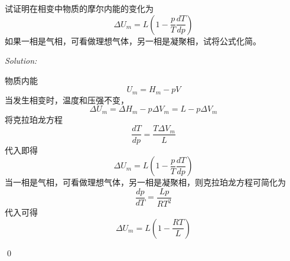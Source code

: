\documentclass[12pt,a4paper]{article}
\newenvironment{problem}[2][Problem]{\begin{trivlist}
\item[\hskip \labelsep {\bfseries #1}\hskip \labelsep {\bfseries #2.}]}{\end{trivlist}}
\newenvironment{sol}
    {\emph{Solution:}
    }
    {
    \qed
    }
\begin{document}
\begin{problem}{3.7}
试证明在相变中物质的摩尔内能的变化为
\[
\Delta U_m=L(1-\frac{p}{T}\frac{dT}{dp})
\]
如果一相是气相，可看做理想气体，另一相是凝聚相，试将公式化简。
\end{problem}
\begin{sol}
物质内能
\begin{equation}
U_m=H_m-pV
\end{equation}
当发生相变时，温度和压强不变，
\begin{equation}
\Delta U_m=\Delta H_m-p\Delta V_m=L-p\Delta V_m
\end{equation}
将克拉珀龙方程
\begin{equation}
\frac{dT}{dp}=\frac{T\Delta V_m}{L}
\end{equation}
代入即得
\begin{equation}
\Delta U_m=L(1-\frac{p}{T}\frac{dT}{dp})
\end{equation}
当一相是气相，可看做理想气体，另一相是凝聚相，则克拉珀龙方程可简化为
\begin{equation}
\frac{dp}{dT}=\frac{Lp}{RT^2}
\end{equation}
代入可得
\begin{equation}
\Delta U_m=L(1-\frac{RT}{L})
\end{equation}
\end{sol}
\end{document}
